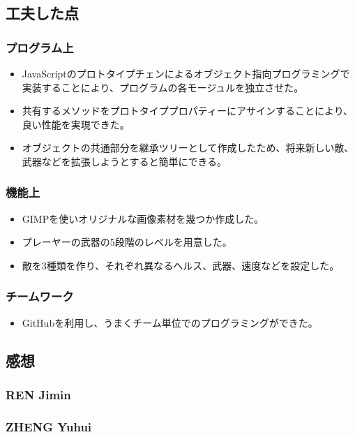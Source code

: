 \subsection{工夫した点}
	\subsubsection{プログラム上}
		\begin{itemize}
			\item JavaScriptのプロトタイプチェンによるオブジェクト指向プログラミングで実装することにより、プログラムの各モージュルを独立させた。
			\item 共有するメソッドをプロトタイププロパティーにアサインすることにより、良い性能を実現できた。
			\item オブジェクトの共通部分を継承ツリーとして作成したため、将来新しい敵、武器などを拡張しようとすると簡単にできる。
		\end{itemize}
	\subsubsection{機能上}
		\begin{itemize}
			\item GIMPを使いオリジナルな画像素材を幾つか作成した。
			\item プレーヤーの武器の5段階のレベルを用意した。
			\item 敵を3種類を作り、それぞれ異なるヘルス、武器、速度などを設定した。
		\end{itemize}
	\subsubsection{チームワーク}
		\begin{itemize}
			\item GitHubを利用し、うまくチーム単位でのプログラミングができた。
		\end{itemize}
\subsection{感想}
	\subsubsection{REN Jimin}
		
	\subsubsection{ZHENG Yuhui}